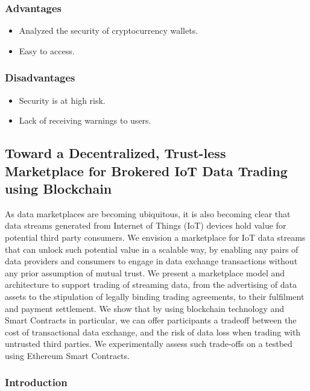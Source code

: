 \documentclass[12pt]{article}
\begin{document}
\newpage
\newpage
\subsubsection{Advantages}
\begin{itemize}
\item Analyzed the security of cryptocurrency wallets.
\item Easy to access.

\end{itemize}
\vspace{10px}
\subsubsection{Disadvantages}
\begin{itemize}
\item Security is at high risk.
\item Lack of receiving warnings to users.
\end{itemize}




\newpage
\subsection{Toward a Decentralized, Trust-less Marketplace for Brokered IoT Data
Trading using Blockchain}
\vspace*{10px}


 As data marketplaces are becoming ubiquitous,
it is also becoming clear that data streams generated from
Internet of Things (IoT) devices hold value for potential third
party consumers. We envision a marketplace for IoT data
streams that can unlock such potential value in a scalable
way, by enabling any pairs of data providers and consumers
to engage in data exchange transactions without any prior
assumption of mutual trust. We present a marketplace model
and architecture to support trading of streaming data, from
the advertising of data assets to the stipulation of legally
binding trading agreements, to their fulfilment and payment
settlement. We show that by using blockchain technology and
Smart Contracts in particular, we can offer participants a tradeoff between the cost of transactional data exchange, and the
risk of data loss when trading with untrusted third parties.
We experimentally assess such trade-offs on a testbed using
Ethereum Smart Contracts.

\subsubsection{Introduction}
\end{document}
